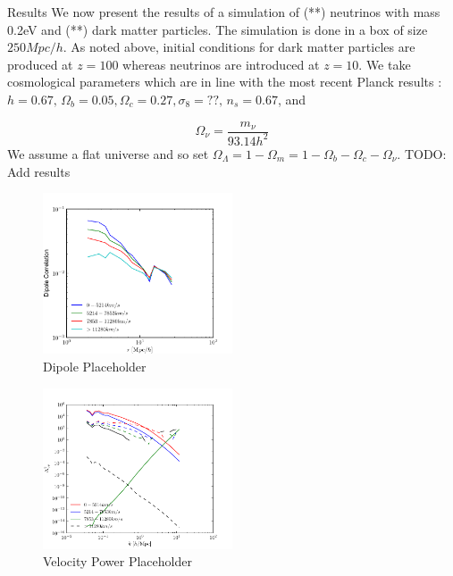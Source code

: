 \begin{section}{Results}
  \label{sec:results}
  We now present the results of a simulation of (**) neutrinos with mass 0.2eV and (**) dark matter particles. The simulation is done in a box of size $250 Mpc/h$. As noted above, initial conditions for dark matter particles are produced at $z=100$ whereas neutrinos are introduced at $z=10$. We take cosmological parameters which are in line with the most recent Planck results \cite{bib:Planck2015}: $h=0.67,\, \Omega_b=0.05, \Omega_c=0.27, \sigma_8=??,\, n_s=0.67 $, and

\begin{equation}
  \Omega_\nu = \frac{m_\nu}{93.14 h^2}
\end{equation}
We assume a flat universe and so set $\Omega_\Lambda=1-\Omega_m=1-\Omega_b-\Omega_c-\Omega_\nu$.
  TODO: Add results

\begin{figure}[htbp]
  \begin{center}
    \includegraphics[width=0.5\textwidth]{./figures/Dipole/dipolefig.pdf}
    \caption{Dipole Placeholder}
    \label{fig:dipolefig}
  \end{center}
\end{figure}

\begin{figure}[htbp]
  \begin{center}
    \includegraphics[width=0.5\textwidth]{./figures/VelPowerSpectra/velpower.pdf}
    \caption{Velocity Power Placeholder}
    \label{fig:velpowerfig}
  \end{center}
\end{figure}

\end{section}
